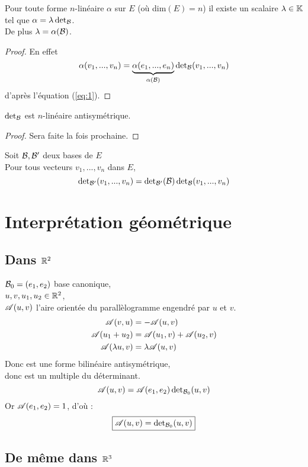 \documentclass[12pt,a4paper,final]{article}
\begin{document}
	\begin{prop}
		Pour toute forme $n$-lin\'eaire $\alpha$ sur $E$ (o\`u dim$(E) = n$)
		il existe un scalaire $\lambda \in \mathbb{K}$ tel que $\alpha=\lambda\operatorname{det}_{\mathcal{B}}$. \\
		De plus $\lambda=\alpha(\mathcal{B})$.
	\end{prop}
	\begin{proof}
		En effet
		\[ \alpha(v_1, ..., v_n) = \underbrace{\alpha(e_1, ..., e_n)}_{\alpha(\mathcal{B})}\operatorname{det}_{\mathcal{B}}(v_1, ..., v_n) \]
		d'apr\`es l'\'equation (\ref{eq:1}).
	\end{proof}
	\begin{prop}
		$\operatorname{det}_{\mathcal{B}}$ est $n$-lin\'eaire antisym\'etrique.
	\end{prop}
	\begin{proof}
		Sera faite la fois prochaine.
	\end{proof}
	\begin{prop}
		Soit $\mathcal{B}, \mathcal{B}'$ deux bases de $E$\\
		Pour tous vecteurs $v_1, ..., v_n$ dans $E$,
		\[ \operatorname{det}_{\mathcal{B}'}(v_1, ..., v_n) = \operatorname{det}_{\mathcal{B}'}(\mathcal{B}) \operatorname{det}_{\mathcal{B}}(v_1, ..., v_n)\]
	\end{prop}
	\section*{Interpr\'etation g\'eom\'etrique}
		\subsection*{Dans $\mathbb{R}^2$}
			\noindent
			$\mathcal{B}_0 = (e_1, e_2)$ base canonique, \\
			$u,v,u_1,u_2 \in \mathbb{R}^2$, \\
			$\mathscr{A}(u, v)$ l'aire orient\'ee du parall\`elogramme engendr\'e par $u$ et $v$.
			\begin{align*}
				\mathscr{A}(v,u)				&= -\mathscr{A}(u,v) \\
				\mathscr{A}(u_1+u_2)			&= \mathscr{A}(u_1,v)+\mathscr{A}(u_2,v) \\
				\mathscr{A}(\lambda u, v)	&= \lambda\mathscr{A}(u,v)
			\end{align*}
			Donc \A est une forme bilin\'eaire antisym\'etrique, \\
			donc \A est un multiple du d\'eterminant.
			\[ \mathscr{A}(u,v) = \mathscr{A}(e_1,e_2)\operatorname{det}_{\mathcal{B}_0}(u,v) \]
			Or $\mathscr{A}(e_1, e_2)=1$, d'o\`u :
			\[\boxed{
				\mathscr{A}(u,v) = \operatorname{det}_{\mathcal{B}_0}(u,v)
			}\]
		\subsection*{De m\^eme dans $\mathbb{R}^3$}
\end{document}
